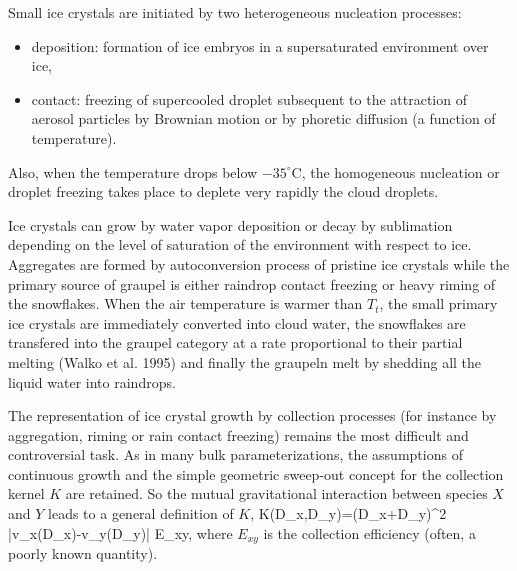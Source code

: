 Small ice crystals are initiated by two heterogeneous nucleation processes:
\begin{itemize}
\item deposition: formation of ice embryos in a supersaturated environment over
ice,
\item contact: freezing of supercooled droplet subsequent to the attraction of
aerosol particles by Brownian motion or by phoretic diffusion (a function of
temperature).
\end{itemize}

Also, when the temperature drops below $-35^\circ$C, the homogeneous nucleation or
droplet freezing takes place to deplete very rapidly the cloud droplets.

Ice crystals can grow by water vapor deposition or decay by sublimation
depending on the level of saturation of the environment with respect to ice.
Aggregates are formed by autoconversion process of pristine ice crystals while
the primary source of graupel is either raindrop contact freezing or heavy
riming of the snowflakes. When the air temperature is warmer than $T_t$, the
small primary ice crystals are immediately converted into cloud water, the
snowflakes are transfered into the graupel category at a rate proportional to
their partial melting (Walko et al. 1995) and finally the graupeln melt by
shedding all the liquid water into raindrops.

The representation of ice crystal growth by collection processes (for instance
by aggregation, riming or rain contact freezing) remains the most difficult and
controversial task. As in many bulk parameterizations, the assumptions of
continuous growth and the simple geometric sweep-out concept for the collection kernel $K$ are retained.
So the mutual gravitational interaction between
species $X$ and $Y$ leads to a general definition of $K$,
%
\be\label{ACC1}
K(D_x,D_y)=(D_x+D_y)^2 |v_x(D_x)-v_y(D_y)| E_{xy},
\ee
%
\noindent where $E_{xy}$ is the collection efficiency (often, a poorly known
quantity).

